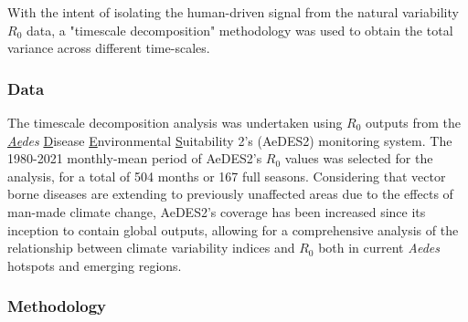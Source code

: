 \documentclass[article,10pt,twocolumn]{wlscirep}
\begin{document}
  With the intent of isolating the human-driven signal from the natural variability $R_0$ data, a "timescale decomposition" methodology was used to obtain the total variance across different time-scales. 
  
  \subsubsection{Data} \label{sec-methods-1-data}
  The timescale decomposition analysis was undertaken using $R_0$ outputs from the \textit{\underline{Ae}des} \underline{D}isease \underline{E}nvironmental \underline{S}uitability 2's (AeDES2) monitoring system. The 1980-2021 monthly-mean period of AeDES2's $R_0$ values was selected for the analysis, for a total of 504 months or 167 full seasons. Considering that vector borne diseases are extending to previously unaffected areas due to the effects of man-made climate change, AeDES2's coverage has been increased since its inception to contain global outputs, allowing for a comprehensive analysis of the relationship between climate variability indices and $R_0$ both in current \textit{Aedes} hotspots and emerging regions.
  
  \subsubsection{Methodology} \label{sec-methods-1-methodology}
  
\end{document}
